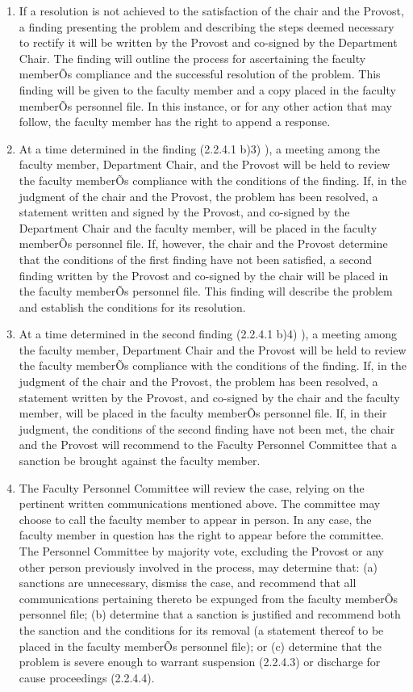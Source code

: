 \documentclass[letterpaper, 11pt]{article}
\begin{document}
\begin{enumerate}[label=\alph*)]
{\begin{enumerate}[label=\arabic*)]
							\item{If a resolution is not achieved to the satisfaction of the chair and the Provost, a finding presenting the problem and describing the steps deemed necessary to rectify it will be written by the Provost and co-signed by the Department Chair. The finding will outline the process for ascertaining the faculty memberÕs compliance and the successful resolution of the problem.  This finding will be given to the faculty member and a copy placed in the faculty memberÕs personnel file. In this instance, or for any other action that may follow, the faculty member has the right to append a response.}
							\item{At a time determined in the finding (2.2.4.1 b)3) ), a meeting among the faculty member, Department Chair, and the Provost will be held to review the faculty memberÕs compliance with the conditions of the finding.  If, in the judgment of the chair and the Provost, the problem has been resolved, a statement written and signed by the Provost, and co-signed by the Department Chair and the faculty member, will be placed in the faculty memberÕs personnel file.  If, however, the chair and the Provost determine that the conditions of the first finding have not been satisfied, a second finding written by the Provost and co-signed by the chair will be placed in the faculty memberÕs personnel file.  This finding will describe the problem and establish the conditions for its resolution.}
							\item{At a time determined in the second finding (2.2.4.1 b)4) ), a meeting among the faculty member, Department Chair and the Provost will be held to review the faculty memberÕs compliance with the conditions of the finding.  If, in the judgment of the chair and the Provost, the problem has been resolved, a statement written by the Provost, and co-signed by the chair and the faculty member, will be placed in the faculty memberÕs personnel file.  If, in their judgment, the conditions of the second finding have not been met, the chair and the Provost will recommend to the Faculty Personnel Committee that a sanction be brought against the faculty member.}
							\item{The Faculty Personnel Committee will review the case, relying on the pertinent written communications mentioned above.  The committee may choose to call the faculty member to appear in person.  In any case, the faculty member in question has the right to appear before the committee.  The Personnel Committee by majority vote, excluding the Provost or any other person previously involved in the process, may determine that: (a) sanctions are unnecessary, dismiss the case, and recommend that all communications pertaining thereto be expunged from the faculty memberÕs personnel file; (b) determine that a sanction is justified and recommend both the sanction and the conditions for its removal (a statement thereof to be placed in the faculty memberÕs personnel file); or (c) determine that the problem is severe enough to warrant suspension (2.2.4.3) or discharge for cause proceedings (2.2.4.4).}

\end{enumerate}}
\end{enumerate}
\end{document}
